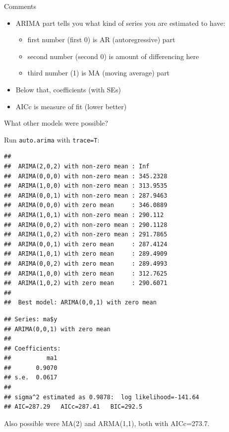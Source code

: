 \documentclass[ignorenonframetext,]{beamer}
\newenvironment{Shaded}{\begin{snugshade}}{\end{snugshade}}
\newcommand{\DataTypeTok}[1]{\textcolor[rgb]{0.13,0.29,0.53}{#1}}
\newcommand{\KeywordTok}[1]{\textcolor[rgb]{0.13,0.29,0.53}{\textbf{#1}}}
\newcommand{\NormalTok}[1]{#1}
\newcommand{\OperatorTok}[1]{\textcolor[rgb]{0.81,0.36,0.00}{\textbf{#1}}}
\providecommand{\tightlist}{%
  \setlength{\itemsep}{0pt}\setlength{\parskip}{0pt}}
\begin{document}
\begin{frame}{Comments}
\protect\hypertarget{comments-48}{}

\begin{itemize}
\tightlist
\item
  ARIMA part tells you what kind of series you are estimated to have:

  \begin{itemize}
  \tightlist
  \item
    first number (first 0) is AR (autoregressive) part
  \item
    second number (second 0) is amount of differencing here
  \item
    third number (1) is MA (moving average) part
  \end{itemize}
\item
  Below that, coefficients (with SEs)
\item
  AICc is measure of fit (lower better)
\end{itemize}

\end{frame}

\begin{frame}[fragile]{What other models were possible?}
\protect\hypertarget{what-other-models-were-possible}{}

Run \texttt{auto.arima} with \texttt{trace=T}:

\small

\begin{Shaded}
\end{Shaded}

\begin{verbatim}
## 
##  ARIMA(2,0,2) with non-zero mean : Inf
##  ARIMA(0,0,0) with non-zero mean : 345.2328
##  ARIMA(1,0,0) with non-zero mean : 313.9535
##  ARIMA(0,0,1) with non-zero mean : 287.9463
##  ARIMA(0,0,0) with zero mean     : 346.0889
##  ARIMA(1,0,1) with non-zero mean : 290.112
##  ARIMA(0,0,2) with non-zero mean : 290.1128
##  ARIMA(1,0,2) with non-zero mean : 291.7865
##  ARIMA(0,0,1) with zero mean     : 287.4124
##  ARIMA(1,0,1) with zero mean     : 289.4909
##  ARIMA(0,0,2) with zero mean     : 289.4993
##  ARIMA(1,0,0) with zero mean     : 312.7625
##  ARIMA(1,0,2) with zero mean     : 290.6071
## 
##  Best model: ARIMA(0,0,1) with zero mean
\end{verbatim}

\begin{verbatim}
## Series: ma$y 
## ARIMA(0,0,1) with zero mean 
## 
## Coefficients:
##          ma1
##       0.9070
## s.e.  0.0617
## 
## sigma^2 estimated as 0.9878:  log likelihood=-141.64
## AIC=287.29   AICc=287.41   BIC=292.5
\end{verbatim}

\normalsize

Also possible were MA(2) and ARMA(1,1), both with AICc=273.7.

\end{frame}
\end{document}
